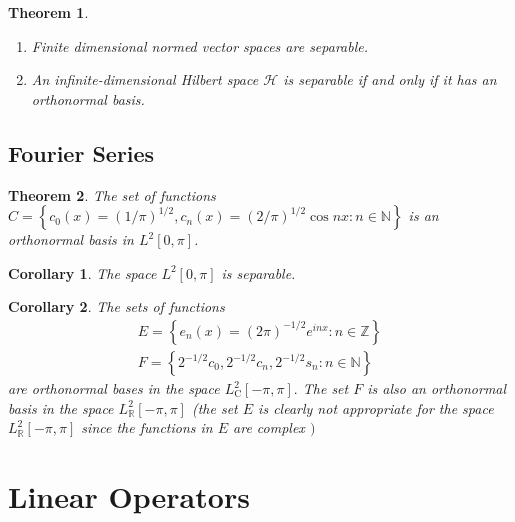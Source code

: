 \documentclass[10pt]{paper}
\newtheorem{theorem}{Theorem}[section]
\newtheorem{corollary}{Corollary}[section]
\begin{document}
\begin{theorem}
    \begin{enumerate}
        \item Finite dimensional normed vector spaces are separable.
        \item An infinite-dimensional Hilbert space $\mathcal{H}$ is separable if and only if it has an orthonormal basis.
    \end{enumerate}
\end{theorem}

\subsection{Fourier Series}

\begin{theorem}
    The set of functions $ C=\left\{c_{0}(x)=(1 / \pi)^{1 / 2}, c_{n}(x)=(2 / \pi)^{1 / 2} \cos n x: n \in \mathbb{N}\right\} $ is an orthonormal basis in $L^{2}[0, \pi]$.
\end{theorem}

\begin{corollary}
    The space $L^{2}[0, \pi]$ is separable.
\end{corollary}

\begin{corollary}
    The sets of functions
    $$
        \begin{array}{l}
            E=\left\{e_{n}(x)=(2 \pi)^{-1 / 2} e^{i n x}: n \in \mathbb{Z}\right\} \\
            F=\left\{2^{-1 / 2} c_{0}, 2^{-1 / 2} c_{n}, 2^{-1 / 2} s_{n}: n \in \mathbb{N}\right\}
        \end{array}
    $$
    are orthonormal bases in the space $L_{\mathrm{C}}^{2}[-\pi, \pi] .$ The set $F$ is also an orthonormal basis in the space $L_{\mathbb{R}}^{2}[-\pi, \pi]$ (the set $E$ is clearly not appropriate for the space $L_{\mathbb{R}}^{2}[-\pi, \pi]$ since the functions in $E$ are complex $)$
\end{corollary}

\section{Linear Operators}
\end{document}
